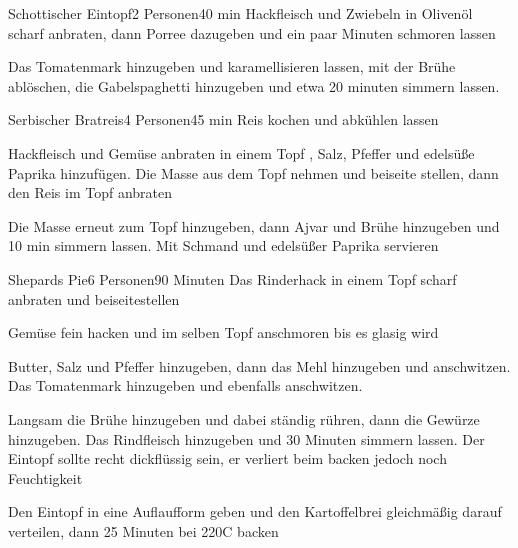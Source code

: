 \begin{recipe}{Schottischer Eintopf}{2 Personen}{40 min}
Hackfleisch und Zwiebeln in Olivenöl scharf anbraten, dann Porree dazugeben und ein paar Minuten schmoren lassen

Das Tomatenmark hinzugeben und karamellisieren lassen, mit der Brühe ablöschen, die Gabelspaghetti hinzugeben und etwa 20 minuten simmern lassen.
\end{recipe}


\begin{recipe}{Serbischer Bratreis}{4 Personen}{45 min}
Reis kochen und abkühlen lassen

Hackfleisch und Gemüse anbraten in einem Topf , Salz, Pfeffer und edelsüße Paprika hinzufügen.
Die Masse aus dem Topf nehmen und beiseite stellen, dann den Reis im Topf anbraten

Die Masse erneut zum Topf hinzugeben, dann Ajvar und Brühe hinzugeben und 10 min simmern lassen. Mit Schmand und edelsüßer Paprika servieren
\end{recipe}


\begin{recipe}{Shepards Pie}{6 Personen}{90 Minuten}
Das Rinderhack in einem Topf scharf anbraten und beiseitestellen

Gemüse fein hacken und im selben Topf anschmoren bis es glasig wird

Butter, Salz und Pfeffer hinzugeben, dann das Mehl hinzugeben und anschwitzen. Das Tomatenmark hinzugeben und ebenfalls anschwitzen.

Langsam die Brühe hinzugeben und dabei ständig rühren, dann die Gewürze hinzugeben. Das Rindfleisch hinzugeben und 30 Minuten simmern lassen. Der Eintopf sollte recht dickflüssig sein, er verliert beim backen jedoch noch Feuchtigkeit

Den Eintopf in eine Auflaufform geben und den Kartoffelbrei gleichmäßig darauf verteilen, dann 25 Minuten bei 220\0C backen
\end{recipe}

